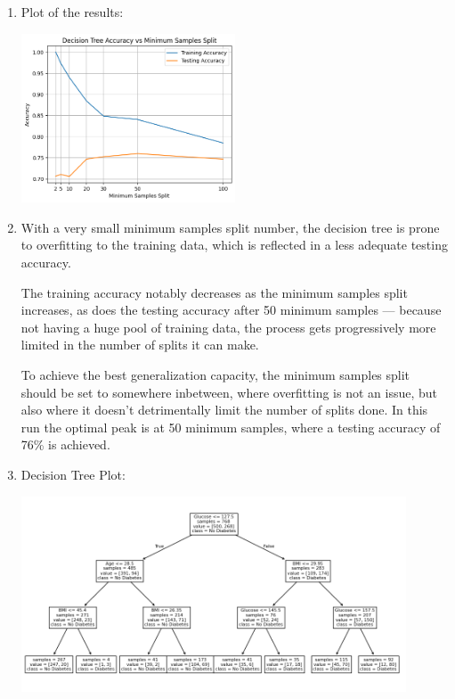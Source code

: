 \documentclass{article}
\begin{document}
\begin{enumerate}[leftmargin=\labelsep]
\vfill

\item Plot of the results:
\begin{center}
    \includegraphics[width=0.5\textwidth]{img/tree_acc_vs_split.png} 
\end{center}

\vfill

\item With a very small minimum samples split number, the decision
tree is prone to overfitting to the training data, which is reflected
in a less adequate testing accuracy.

The training accuracy notably decreases as the minimum samples
split increases, as does the testing accuracy after 50 minimum
samples --- because not having a huge pool of training data,
the process gets progressively more limited in the number of splits
it can make.

To achieve the best generalization capacity, the minimum samples
split should be set to somewhere inbetween, where overfitting is not
an issue, but also where it doesn't detrimentally limit the number
of splits done. In this run the optimal peak is at 50 minimum 
samples, where a testing accuracy of 76\% is achieved.

\vfill
\newpage

\item Decision Tree Plot:
    \begin{center}
        \includegraphics[width=0.9\textwidth]{img/tree_plot.png} 
    \end{center}


\end{enumerate}
\end{document}
